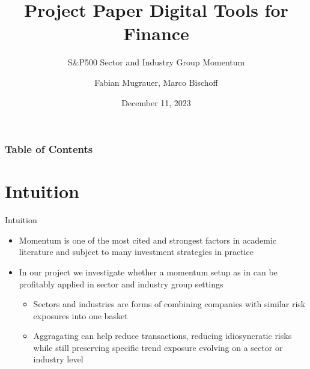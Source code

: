 \documentclass{beamer}
\title[Sector and Industry Group Momentum]{Project Paper Digital Tools for Finance}
\subtitle{S\&P500 Sector and Industry Group Momentum}
\author[Fabian Mugrauer, Marco Bischoff]{
	Fabian Mugrauer,
	Marco Bischoff}
\institute[]{University of Zurich\\ Department of Banking \& Finance \\Igor Pozdeev}
\date{December 11, 2023}
\begin{document}
\begin{frame}
\maketitle
\end{frame}


\begin{frame}
\frametitle{Table of Contents}
\tableofcontents
\end{frame}
\section{Intuition}
\begin{frame}{Intuition}    
\begin{itemize}
    \item Momentum is one of the most cited and strongest factors in academic literature and subject to many investment strategies in practice
    \item In our project we investigate whether a momentum setup as in \cite{jegadeesh1993returns} can be profitably applied in sector and industry group settings
        \begin{itemize}
            \item Sectors and industries are forms of combining companies with similar risk exposures into one basket
            \item Aggragating can help reduce transactions, reducing idiosyncratic risks while still preserving specific trend exposure evolving on a sector or industry level
        \end{itemize}
\end{itemize}
\end{frame}
\end{document}
